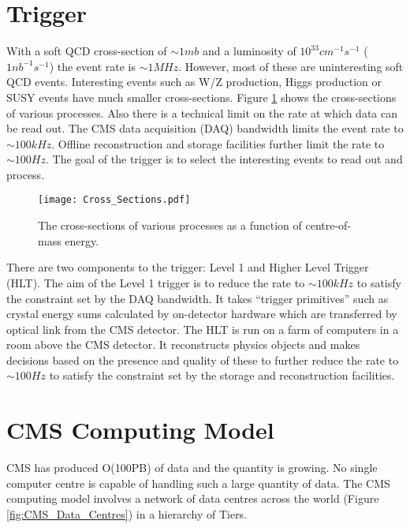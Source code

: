 \section{Trigger}

With a soft QCD cross-section of $\sim1\unit{mb}$ and a luminosity of
$10^{33}\unit{cm^{-1}s^{-1}}$ ($1\unit{nb^{-1}s^{-1}}$) the event rate is $\sim 
1\unit{MHz}$. However, most of these are uninteresting soft QCD events. 
Interesting events such as W/Z production, Higgs production or SUSY events have 
much smaller cross-sections. Figure \ref{fig:cross_sections} shows the 
cross-sections of various processes. Also there is a technical limit on the rate 
at which data can be read out. The CMS data acquisition (DAQ) bandwidth limits 
the event rate to $\sim 100\unit{kHz}$. Offline reconstruction and storage 
facilities further limit the rate to $\sim 100\unit{Hz}$. The goal of the 
trigger is to select the interesting events to read out and process. \\

\begin{figure}
\begin{center}
\texttt{[image: Cross\_Sections.pdf]}
\end{center}
\caption{The cross-sections of various processes as a function of centre-of-mass
energy.}
\label{fig:cross_sections}
\end{figure}

There are two components to the trigger: Level 1 and Higher Level Trigger (HLT). 
The aim of the Level 1 trigger is to reduce the rate to $\sim 100\unit{kHz}$ to 
satisfy the constraint set by the DAQ bandwidth. It takes ``trigger primitives'' 
such as crystal energy sums calculated by on-detector hardware which are 
transferred by optical link from the CMS detector. The HLT is run on a farm of 
computers in a room above the CMS detector. It reconstructs physics objects and 
makes decisions based on the presence and quality of these to further reduce 
the rate to $\sim 100\unit{Hz}$ to satisfy the constraint set by the storage and 
reconstruction facilities.

\section{CMS Computing Model}

CMS has produced O(100PB) of data and the quantity is growing. No single computer
centre is capable of handling such a large quantity of data. The CMS computing
model involves a network of data centres across the world (Figure 
\ref{fig:CMS_Data_Centres}) in a hierarchy of Tiers. 

